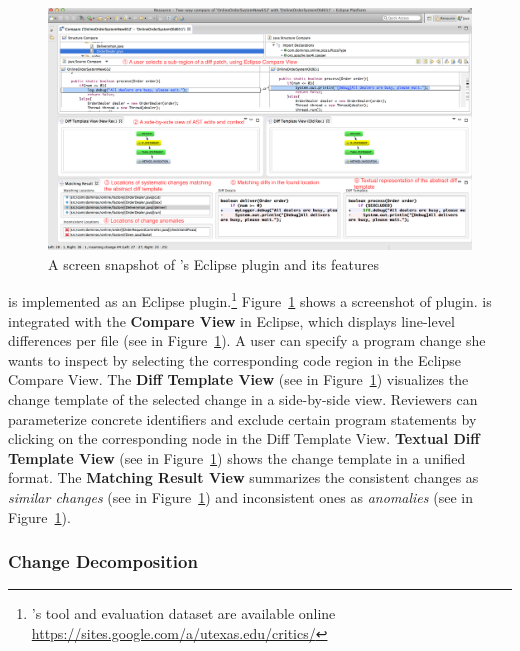 \documentclass[runningheads,a4paper]{llncs}
\begin{document}
\begin{figure}[ht]
 \centering
 \includegraphics[width=\textwidth]{images/critics-UI.pdf}
 \caption{A screen snapshot of {\critics}'s Eclipse plugin and its features}
 \label{fig:critics-UI}
\end{figure}

{\critics} is implemented as an Eclipse plugin.\footnote{{\critics}'s tool and evaluation dataset are available online \url{https://sites.google.com/a/utexas.edu/critics/}} Figure~\ref{fig:critics-UI} shows a screenshot of {\critics} plugin. {\critics} is integrated with the {\bf Compare View} in Eclipse, which displays line-level differences per file (see  in Figure~\ref{fig:critics-UI}). A user can specify a program change she wants to inspect by selecting the corresponding code region in the Eclipse Compare View. The {\bf Diff Template View} (see  in Figure~\ref{fig:critics-UI}) visualizes the change template of the selected change in a side-by-side view. Reviewers can parameterize concrete identifiers and exclude certain program statements by clicking on the corresponding node in the Diff Template View. {\bf Textual Diff Template View} (see  in Figure~\ref{fig:critics-UI}) shows the change template in a unified format. The {\bf Matching Result View} summarizes the consistent changes as {\em similar changes} (see  in Figure~\ref{fig:critics-UI}) and inconsistent ones as {\em anomalies} (see  in Figure~\ref{fig:critics-UI}).


\subsubsection{Change Decomposition} 
\end{document}
